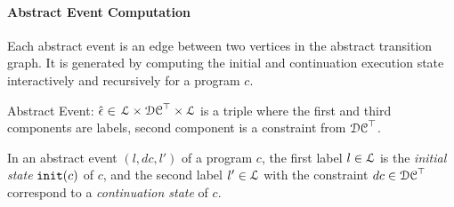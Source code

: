  \paragraph{Abstract Event Computation} Each abstract event is an edge between two vertices in the abstract transition graph.
 It is generated by computing the initial and continuation execution state interactively and recursively for a program $c$.
 
 \begin{defn}
 \label{def:abs_event}
 Abstract Event: 
 $\hat{\mathtt{\epsilon}{}} \in $
 $\mathcal{L} \times \mathcal{DC}^{\top} \times \mathcal{L}$
 is a 
 triple where the first and third components are labels,
 second component is a constraint from $\mathcal{DC}^{\top}$.
 \end{defn}
 In an abstract event $(l, dc, l')$ of a program $c$, 
 the first label $l \in \mathcal{L}$ is the \emph{initial state} $\mathtt{init}(c)$ of $c$, and 
 the second label $l' \in \mathcal{L}$ with the constraint $dc \in \mathcal{DC}^{\top}$ correspond to a \emph{continuation state} of $c$.

